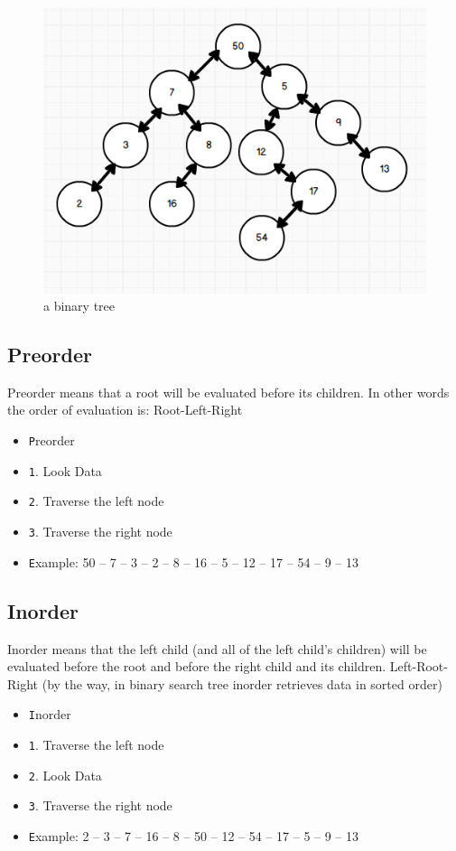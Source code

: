 \documentclass[12pt]{article}
\begin{document}
        \begin{figure}
        \centering
      \includegraphics[width=\linewidth/3*2]{binary-tree.png}

        \caption{a binary tree}
    \end{figure}
    \newpage
    \subsection{Preorder}
    Preorder means that a root will be evaluated before its children. In other words the order of evaluation is: Root-Left-Right
    \begin{itemize}
     \item \texttt Preorder
     \item \texttt 1. Look Data
     \item \texttt 2. Traverse the left node
     \item \texttt 3. Traverse the right node 
     \item \texttt Example:  50 – 7 – 3 – 2 – 8 – 16 – 5 – 12 – 17 – 54 – 9 – 13
    \end{itemize}
    \subsection{Inorder}
    Inorder means that the left child (and all of the left child’s children) will be evaluated before the root and before the right child and its children. Left-Root-Right (by the way, in binary search tree inorder retrieves data in sorted order)
    \begin{itemize}
     \item \texttt Inorder
     \item \texttt 1. Traverse the left node
     \item \texttt 2. Look Data
     \item \texttt 3. Traverse the right node 
     \item \texttt Example:  2 – 3 – 7 – 16 – 8 – 50 – 12 – 54 – 17 – 5 – 9 – 13
    \end{itemize}
\end{document}
